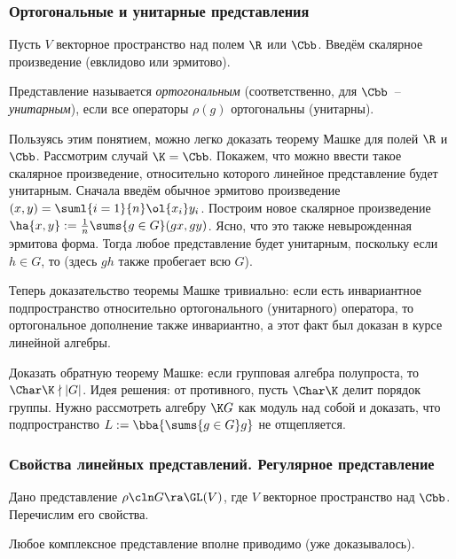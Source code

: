 \documentclass[a4paper]{article}
\newcommand{\sumg}{\sums{g\in G}}
\begin{document}
\subsubsection{Ортогональные и унитарные представления}

Пусть $V$ векторное пространство над полем $\R$ или $\Cbb$. Введём скалярное произведение (евклидово или эрмитово).

\begin{df}
Представление называется \emph{ортогональным} (соответственно, для $\Cbb$~-- \emph{унитарным}), если  все
операторы $\rho(g)$ ортогональны (унитарны).
\end{df}

Пользуясь этим понятием, можно легко доказать теорему Машке для полей $\R$ и $\Cbb$. Рассмотрим случай $\K=\Cbb$.
Покажем, что можно ввести такое скалярное произведение, относительно которого линейное представление будет унитарным. Сначала введём обычное эрмитово
произведение $(x,y)=\suml{i=1}{n}\ol{x_i}y_i$. Построим новое скалярное произведение $\ha{x,y}:=\frac{1}{n}\sumg(gx,gy)$. Ясно, что это также
невырожденная эрмитова форма. Тогда любое представление будет унитарным, поскольку если
$h \in G$, то
(здесь $gh$ также пробегает всю $G$).

Теперь доказательство теоремы Машке тривиально: если есть инвариантное подпространство относительно
ортогонального (унитарного) оператора, то ортогональное дополнение также инвариантно, а этот факт был доказан
в курсе линейной алгебры.

\begin{problem}
Доказать обратную теорему Машке: если групповая алгебра полупроста, то $\Char\K \nmid |G|$. Идея решения: от противного, пусть $\Char \K$
делит порядок группы. Нужно рассмотреть алгебру $\K G$ как модуль над собой и доказать, что подпространство $L:= \bba{\sumg g}$ не отщепляется.
\end{problem}

\subsubsection{Свойства линейных представлений. Регулярное представление}

Дано представление $\rho\cln G \ra \GL(V)$, где $V$ векторное пространство над $\Cbb$. Перечислим  его свойства.

\begin{stm}
Любое комплексное представление вполне приводимо (уже доказывалось).
\end{stm}
\end{document}
